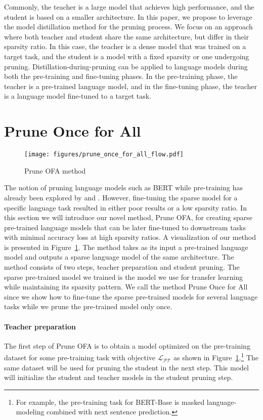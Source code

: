 \documentclass{article}
\begin{document}
Commonly, the teacher is a large model that achieves high performance, and the student is based on a smaller architecture. 
In this paper, we propose to leverage the model distillation method for the pruning process. 
We focus on an approach where both teacher and student share the same architecture, but differ in their sparsity ratio. 
In this case, the teacher is a dense model that was trained on a target task, and the student is a model with a fixed sparsity or one undergoing pruning. 
Distillation-during-pruning can be applied to language models during both the pre-training and fine-tuning phases. 
In the pre-training phase, the teacher is a pre-trained language model, and in the fine-tuning phase, the teacher is a language model fine-tuned to a target task. 

\section{Prune Once for All}
\label{sec:sparse-pre-train-models}
\begin{figure}[t]
\centering
	\texttt{[image: figures/prune\_once\_for\_all\_flow.pdf]}
    \caption{Prune OFA method}
    \label{fig:prune-once-for-all}
\end{figure}
The notion of pruning language models such as BERT \citep{devlin2018bert} while pre-training has already been explored by \citet{chen2020lottery} and \citet{gordon2020pre-train}.
However, fine-tuning the sparse model for a specific language task resulted in either poor results or a low sparsity ratio.
In this section we will introduce our novel method, Prune OFA, for creating sparse pre-trained language models that can be later fine-tuned to downstream tasks with minimal accuracy loss at high sparsity ratios.
A visualization of our method is presented in Figure~\ref{fig:prune-once-for-all}.
The method takes as its input a pre-trained language model and outputs a sparse language model of the same architecture.
The method consists of two steps, teacher preparation and student pruning. The sparse pre-trained model we trained is the model we use for transfer learning while maintaining its sparsity pattern.
We call the method Prune Once for All since we show how to fine-tune the sparse pre-trained models for several language tasks while we prune the pre-trained model only once.

\paragraph{Teacher preparation}
The first step of Prune OFA is to obtain a model optimized on the pre-training dataset for some pre-training task with objective $\mathcal{L_{PT}}$ as shown in Figure~\ref{fig:prune-once-for-all}.\footnote{For example, the pre-training task for BERT-Base is masked language-modeling combined with next sentence prediction.}
The same dataset will be used for pruning the student in the next step.
This model will initialize the student and teacher models in the student pruning step.
\end{document}
